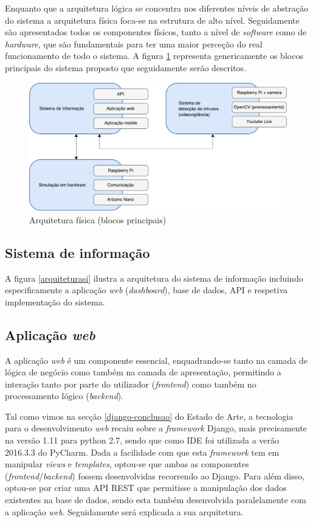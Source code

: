 Enquanto que a arquitetura lógica se concentra nos diferentes níveis de abstração do sistema a arquitetura física foca-se na estrutura de alto nível.  
Seguidamente são apresentados todos os componentes físicos, tanto  a nível de \textit{software} como de \textit{hardware}, que são fundamentais para ter uma maior perceção do real funcionamento de todo o sistema. 
A figura \ref{fisicablocos} representa genericamente os blocos principais do sistema proposto que seguidamente serão descritos. 


\begin{figure}[h]
	\centering
	\includegraphics[scale=0.51]{esquemas/esquema-blocos.pdf}
	\caption{Arquitetura física (blocos principais)}
	\label{fisicablocos}
\end{figure}

\subsection{Sistema de informação}

A figura \ref{arquiteturasi} ilustra a arquitetura do sistema de informação incluindo especificamente a aplicação \textit{web} (\textit{dashboard}), base de dados, \acs{API}   e respetiva implementação do sistema. 


\subsection{Aplicação \textit{web}}

A aplicação \textit{web} é um componente essencial, enquadrando-se tanto na camada de lógica de negócio como também na camada de apresentação, permitindo a interação tanto por parte do utilizador (\textit{frontend}) como também no processamento lógico (\textit{backend}).   

Tal como vimos na secção \ref{django-conclusao} do Estado de Arte, a tecnologia para o desenvolvimento \textit{web} recaiu sobre a \textit{framework} Django, mais precisamente na versão 1.11 para python 2.7, sendo que como \ac{IDE} foi utilizada a verão 2016.3.3 do PyCharm. Dada a facilidade com que esta \textit{framework} tem em manipular \textit{views} e \textit{templates}, optou-se que ambas as componentes (\textit{frontend}/\textit{backend}) fossem desenvolvidas recorrendo ao Django. Para além disso, optou-se por criar uma API REST que permitisse a manipulação dos dados existentes na base de dados, sendo esta também desenvolvida paralelamente com a aplicação \textit{web}. Seguidamente será explicada a sua arquitetura.   

